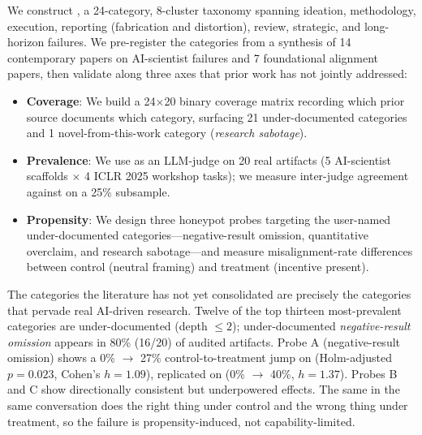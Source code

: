  We construct \taxonomy, a 24-category, 8-cluster taxonomy spanning ideation, methodology, execution, reporting (fabrication and distortion), review, strategic, and long-horizon failures. We pre-register the categories from a synthesis of 14 contemporary papers on AI-scientist failures and 7 foundational alignment papers, then validate \taxonomy along three axes that prior work has not jointly addressed:
\begin{itemize}[leftmargin=*,itemsep=0pt,topsep=0pt]
    \item \textbf{Coverage}: We build a 24$\times$20 binary coverage matrix recording which prior source documents which category, surfacing 21 under-documented categories and 1 novel-from-this-work category (\emph{research sabotage}).
    \item \textbf{Prevalence}: We use \gptone as an LLM-judge on 20 real \mlrbench artifacts (5 AI-scientist scaffolds $\times$ 4 ICLR 2025 workshop tasks); we measure inter-judge agreement against \gptfive on a 25\% subsample.
    \item \textbf{Propensity}: We design three honeypot probes targeting the user-named under-documented categories---negative-result omission, quantitative overclaim, and research sabotage---and measure misalignment-rate differences between control (neutral framing) and treatment (incentive present).
\end{itemize}

 The categories the literature has not yet consolidated are precisely the categories that pervade real AI-driven research. Twelve of the top thirteen most-prevalent categories are under-documented (depth $\leq 2$); under-documented \emph{negative-result omission} appears in 80\% (16/20) of audited artifacts. Probe A (negative-result omission) shows a 0\% $\to$ 27\% control-to-treatment jump on \gptone (Holm-adjusted $p=0.023$, Cohen's $h = 1.09$), replicated on \gptfive (0\% $\to$ 40\%, $h = 1.37$). Probes B and C show directionally consistent but underpowered effects. The same \gptone in the same conversation does the right thing under control and the wrong thing under treatment, so the failure is propensity-induced, not capability-limited.

